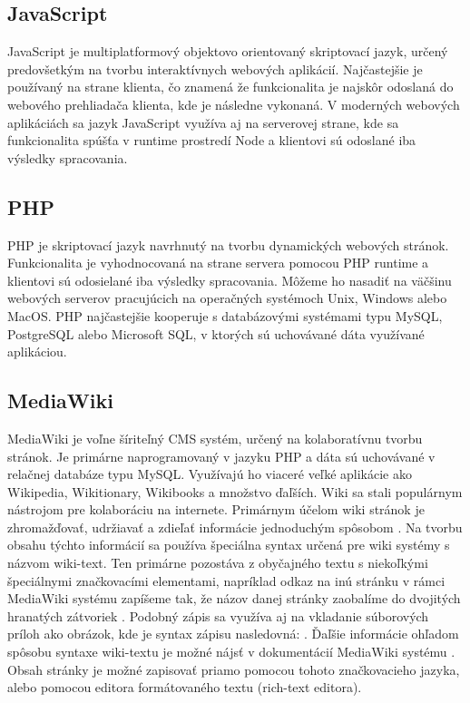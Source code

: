 \subsection{JavaScript}
JavaScript je multiplatformový objektovo orientovaný skriptovací jazyk, určený predovšetkým na tvorbu interaktívnych webových aplikácií. Najčastejšie je používaný na strane klienta, čo znamená že funkcionalita je najskôr odoslaná do webového prehliadača klienta, kde je následne vykonaná. V moderných webových aplikáciách sa jazyk JavaScript využíva aj na serverovej strane, kde sa funkcionalita spúšťa v runtime prostredí Node a klientovi sú odoslané iba výsledky spracovania. 

\subsection{PHP}
PHP je skriptovací jazyk navrhnutý na tvorbu dynamických webových stránok. Funkcionalita je vyhodnocovaná na strane servera pomocou PHP runtime a klientovi sú odosielané iba výsledky spracovania. Môžeme ho nasadiť na väčšinu webových serverov pracujúcich na operačných systémoch Unix, Windows alebo MacOS. PHP najčastejšie kooperuje s databázovými systémami typu MySQL, PostgreSQL alebo Microsoft SQL, v ktorých sú uchovávané dáta využívané aplikáciou.

\subsection{MediaWiki}
MediaWiki je voľne šíriteľný CMS systém, určený na kolaboratívnu tvorbu stránok. Je primárne naprogramovaný v jazyku PHP a dáta sú uchovávané v relačnej databáze typu MySQL. Využívajú ho viaceré veľké aplikácie ako Wikipedia, Wikitionary, Wikibooks a množstvo ďaľších. 
Wiki sa stali populárnym nástrojom pre kolaboráciu na internete. Primárnym účelom wiki stránok je zhromažďovať, udržiavať a zdieľať informácie jednoduchým spôsobom \cite{krotzsch2006semantic}. Na tvorbu obsahu týchto informácií sa používa špeciálna syntax určená pre wiki systémy s názvom wiki-text. Ten primárne pozostáva z obyčajného textu s niekoľkými špeciálnymi značkovacími elementami, napríklad odkaz na inú stránku v rámci MediaWiki systému zapíšeme tak, že názov danej stránky zaobalíme do dvojitých hranatých zátvoriek . Podobný zápis sa využíva aj na vkladanie súborových príloh ako obrázok, kde je syntax zápisu nasledovná: . Ďaľšie informácie ohľadom spôsobu syntaxe wiki-textu je možné nájsť v dokumentácií MediaWiki systému \citep{MediaWikiHelpFormating}. Obsah stránky je možné zapisovať priamo pomocou tohoto značkovacieho jazyka, alebo pomocou editora formátovaného textu (rich-text editora).

